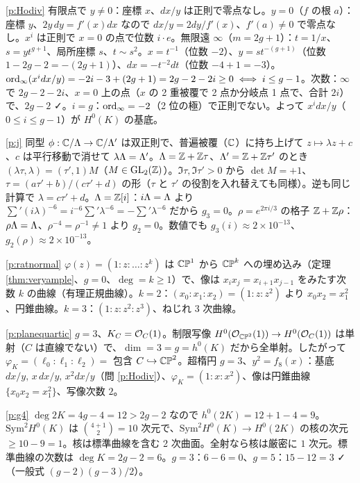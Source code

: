\begin{sol}{\ref{p:Hodiv}}
有限点で $y\ne0$：座標 $x$、$dx/y$ は正則で零点なし。$y=0$（$f$ の根 $a$）：座標 $y$、$2y\,dy=f'(x)dx$ なので $dx/y=2dy/f'(x)$、$f'(a)\ne0$ で零点なし。$x^i$ は正則で $x=0$ の点で位数 $i\cdot e$。無限遠 $\infty$（$m=2g+1$）：$t=1/x$、$s=y t^{g+1}$、局所座標 $s$、$t\sim s^2$。$x=t^{-1}$（位数 $-2$）、$y=st^{-(g+1)}$（位数 $1-2g-2=-(2g+1)$）、$dx=-t^{-2}dt$（位数 $-4+1=-3$）。$\operatorname{ord}_\infty(x^idx/y)=-2i-3+(2g+1)=2g-2-2i\ge0\iff i\le g-1$。次数：$\infty$ で $2g-2-2i$、$x=0$ 上の点（$x$ の 2 重被覆で 2 点か分岐点 1 点で、合計 $2i$）で、$2g-2$ ✓。$i=g$：$\operatorname{ord}_\infty=-2$（2 位の極）で正則でない。よって $x^i dx/y$（$0\le i\le g-1$）が $H^0(K)$ の基底。
\end{sol}
\begin{sol}{\ref{p:j}}
同型 $\phi:\mathbb C/\Lambda\to\mathbb C/\Lambda'$ は双正則で、普遍被覆（$\mathbb C$）に持ち上げて $z\mapsto\lambda z+c$、$c$ は平行移動で消せて $\lambda\Lambda=\Lambda'$。$\Lambda=\mathbb Z+\mathbb Z\tau$、$\Lambda'=\mathbb Z+\mathbb Z\tau'$ のとき $(\lambda\tau,\lambda)=(\tau',1)M$（$M\in\mathrm{GL}_2(\mathbb Z)$）。$\Im\tau,\Im\tau'>0$ から $\det M=+1$、$\tau=(a\tau'+b)/(c\tau'+d)$ の形（$\tau$ と $\tau'$ の役割を入れ替えても同様）。逆も同じ計算で $\lambda=c\tau'+d$。$\Lambda=\mathbb Z[i]$：$i\Lambda=\Lambda$ より $\sum'(i\lambda)^{-6}=i^{-6}\sum'\lambda^{-6}=-\sum'\lambda^{-6}$ だから $g_3=0$。$\rho=e^{2\pi i/3}$ の格子 $\mathbb Z+\mathbb Z\rho$：$\rho\Lambda=\Lambda$、$\rho^{-4}=\rho^{-1}\ne1$ より $g_2=0$。数値でも $g_3(i)\approx2\times10^{-13}$、$g_2(\rho)\approx2\times10^{-13}$。
\end{sol}
\begin{sol}{\ref{p:ratnormal}}
$\varphi(z)=(1:z:\dots:z^k)$ は $\mathbb{CP}^1$ から $\mathbb{CP}^k$ への埋め込み（定理 \ref{thm:veryample}、$g=0$、$\deg=k\ge1$）で、像は $x_ix_j=x_{i+1}x_{j-1}$ をみたす次数 $k$ の曲線（有理正規曲線）。$k=2$：$(x_0:x_1:x_2)=(1:z:z^2)$ より $x_0x_2=x_1^2$、円錐曲線。$k=3$：$(1:z:z^2:z^3)$、ねじれ 3 次曲線。
\end{sol}
\begin{sol}{\ref{p:planequartic}}
$g=3$、$K_C=\mathcal O_C(1)$。制限写像 $H^0(\mathcal O_{\mathbb{CP}^2}(1))\to H^0(\mathcal O_C(1))$ は単射（$C$ は直線でない）で、$\dim=3=g=h^0(K)$ だから全単射。したがって $\varphi_K=(\ell_0:\ell_1:\ell_2)=$ 包含 $C\hookrightarrow\mathbb{CP}^2$。超楕円 $g=3$、$y^2=f_8(x)$：基底 $dx/y,\,x\,dx/y,\,x^2dx/y$（問 \ref{p:Hodiv}）、$\varphi_K=(1:x:x^2)$、像は円錐曲線 $\{x_0x_2=x_1^2\}$、写像次数 $2$。
\end{sol}
\begin{sol}{\ref{p:g4}}
$\deg2K=4g-4=12>2g-2$ なので $h^0(2K)=12+1-4=9$。$\mathrm{Sym}^2H^0(K)$ は $\binom{4+1}2=10$ 次元で、$\mathrm{Sym}^2H^0(K)\to H^0(2K)$ の核の次元 $\ge10-9=1$。核は標準曲線を含む 2 次曲面。全射なら核は厳密に $1$ 次元。標準曲線の次数は $\deg K=2g-2=6$。$g=3$：$6-6=0$、$g=5$：$15-12=3$ ✓（一般式 $(g-2)(g-3)/2$）。
\end{sol}
